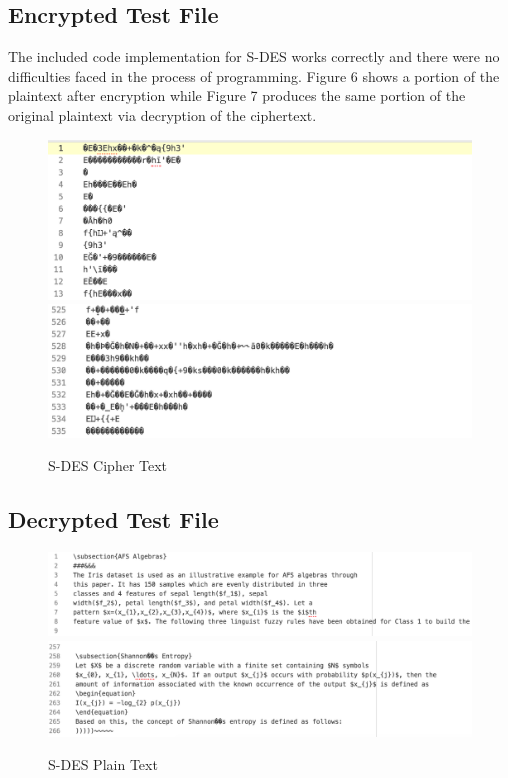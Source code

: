 \documentclass[]{article}
\begin{document}
\newpage
\subsection*{Encrypted Test File}

The included code implementation for S-DES works correctly and there were no difficulties faced in the process of programming. Figure 6 shows a portion of the  plaintext after encryption while Figure 7 produces the same portion of the original plaintext via decryption of the ciphertext.

\begin{figure}[H]
	\includegraphics[height=\textheight/6,width=\textwidth]{sdes_cipher1.png}
	\includegraphics[height=\textheight/6,width=\textwidth]{sdes_cipher2.png}	
	\caption{S-DES Cipher Text}
	\centering
\end{figure}

\vspace{0.5cm}
\subsection*{Decrypted Test File}

\begin{figure}[H]
	\includegraphics[width=\textwidth]{sdes_plain1.png}
	\includegraphics[width=\textwidth]{sdes_plain2.png}	
	\caption{S-DES Plain Text}
	\centering
\end{figure}
\end{document}
